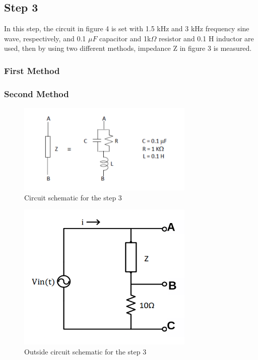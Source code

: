 \documentclass[letterpaper,12pt]{article}
\begin{document}
\subsection{Step 3}

In this step, the circuit in figure 4 is set with 1.5 kHz and 3 kHz frequency sine wave, respectively, and 0.1 \(\mu F\) capacitor and 1k\(\Omega \) resistor and 0.1 H inductor are used, then by using two different methods, impedance Z in figure 3 is measured. 

\subsubsection{First Method}


\subsubsection{Second Method}

\begin{figure}[H]
    \centering
    \includegraphics[width = 0.75\textwidth]{3SCH.png}
    \caption{Circuit schematic for the step 3}
\end{figure} 

\begin{figure}[H]
    \centering
    \includegraphics[width = 0.75\textwidth]{3_1SCH.png}
    \caption{Outside circuit schematic for the step 3}
\end{figure} 
\end{document}
